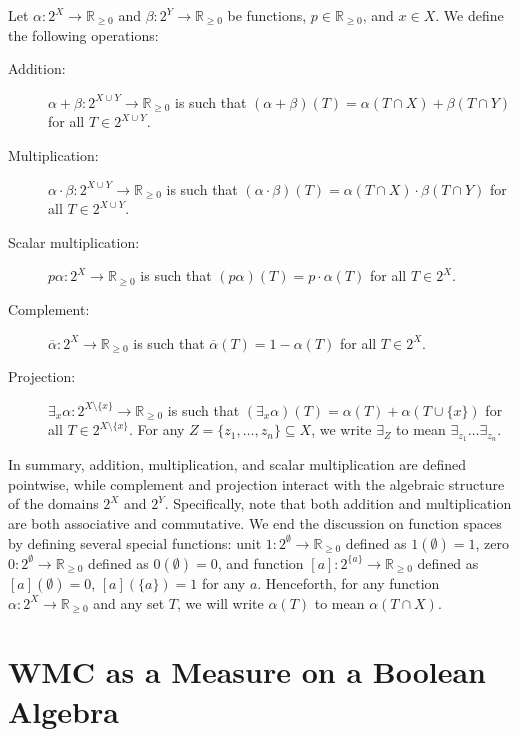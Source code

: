 \begin{definition}
  Let $\alpha\colon 2^X \to \mathbb{R}_{\ge 0}$ and $\beta\colon 2^Y \to
  \mathbb{R}_{\ge 0}$ be functions, $p \in \mathbb{R}_{\ge 0}$, and $x \in X$.
  We define the following operations:
  \begin{description}
  \item[Addition:] $\alpha + \beta\colon 2^{X \cup Y} \to \mathbb{R}_{\ge 0}$ is
    such that $(\alpha + \beta)(T) = \alpha(T \cap X) + \beta(T \cap Y)$ for all
    $T \in 2^{X \cup Y}$.
  \item[Multiplication:] $\alpha \cdot \beta\colon 2^{X \cup Y} \to
    \mathbb{R}_{\ge 0}$ is such that $(\alpha \cdot \beta)(T) = \alpha(T \cap X)
    \cdot \beta(T \cap Y)$ for all $T \in 2^{X \cup Y}$.
  \item[Scalar multiplication:] $p\alpha\colon 2^X \to \mathbb{R}_{\ge 0}$ is
    such that $(p\alpha)(T) = p \cdot \alpha(T)$ for all $T \in 2^X$.
  \item[Complement:] $\overline{\alpha}\colon 2^X \to \mathbb{R}_{\ge 0}$ is
    such that $\overline{\alpha}(T) = 1 - \alpha(T)$ for all $T \in 2^X$.
  \item[Projection:] $\exists_x\alpha\colon 2^{X \setminus \{ x \}} \to
    \mathbb{R}_{\ge 0}$ is such that $(\exists_x\alpha)(T) = \alpha(T) +
    \alpha(T \cup \{ x \})$ for all $T \in 2^{X \setminus \{x \}}$. For any $Z =
    \{ z_1, \dots, z_n \} \subseteq X$, we write $\exists_Z$ to mean
    $\exists_{z_1}\dots\exists_{z_n}$.
  \end{description}
\end{definition}

In summary, addition, multiplication, and scalar multiplication are defined
pointwise, while complement and projection interact with the algebraic structure
of the domains $2^X$ and $2^Y$. Specifically, note that both addition and
multiplication are both associative and commutative. We end the discussion on
function spaces by defining several special functions: unit $1\colon 2^\emptyset
\to \mathbb{R}_{\ge 0}$ defined as $1(\emptyset) = 1$, zero $0\colon 2^\emptyset
\to \mathbb{R}_{\ge 0}$ defined as $0(\emptyset) = 0$, and function $[a]\colon
2^{\{a\}} \to \mathbb{R}_{\ge 0}$ defined as $[a](\emptyset) = 0$, $[a](\{a\}) =
1$ for any $a$. Henceforth, for any function $\alpha\colon 2^X \to
\mathbb{R}_{\ge 0}$ and any set $T$, we will write $\alpha(T)$ to mean $\alpha(T
\cap X)$.

\section{WMC as a Measure on a Boolean Algebra} \label{sec:wmc_as_measure}

